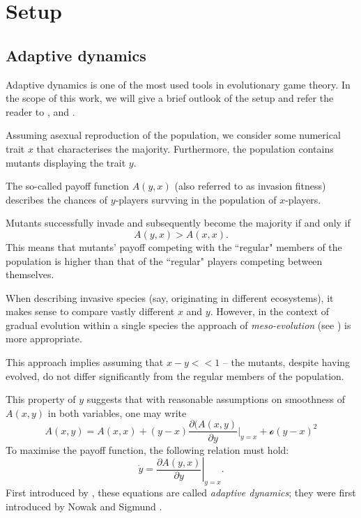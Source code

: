 \documentclass{article}
\theoremstyle{definition}
\numberwithin{equation}{section}
\begin{document}
\section{Setup}
\subsection{Adaptive dynamics}
\label{sec: adaptive dynamics}
Adaptive dynamics is one of the most used tools in evolutionary game theory. In the scope of this work, we will give a brief outlook of the setup and refer the reader to \cite{balabanova2024adaptive, stewart:scirep:2016},  and \cite{Mamiya:PRE:2020}. 

Assuming asexual reproduction of the population, we consider some numerical trait $x$ that characterises the majority. Furthermore, the population contains mutants displaying the trait $y$. 

The so-called payoff function $A(y,x)$ (also referred to as invasion fitness) describes the chances of $y$-players survving in the population of $x$-players. 

Mutants successfully invade and subsequently become the majority if and only if
\[
A(y,x)> A(x,x).
\]
This means that mutants' payoff competing with the ``regular" members of the population is higher than that of the ``regular" players competing between themselves. 

When describing invasive species (say, originating in different ecosystems), it makes sense to compare vastly different $x$ and $y$. However, in the context of gradual evolution within a single species the approach of \textit{meso-evolution} (see  \cite{metz2012adaptive})   is more appropriate. 

This approach implies assuming that $x-y<<1$ -- the mutants, despite having evolved, do not differ significantly from the regular members of the population. 

This property of $y$ suggests that with reasonable assumptions on smoothness of $A(x,y)$ in both variables, one may write
\[
A(x,y) = A(x,x) + (y-x)\frac{\partial (A(x,y)}{\partial y}\big\vert_{y=x} + \mathcal{o}(y-x)^2
\]
To maximise the payoff function, the following relation must hold:
\begin{equation}
    \label{eq: adaptive dynamics}
    \dot{y} = \left. \frac{\partial A(y,x)}{\partial y}\right|_{y=x}.
\end{equation}
First introduced by \cite{hofbauer1990adaptive}, these equations are called \textit{adaptive dynamics}; they were first introduced by Nowak and Sigmund \cite{nowak:AAM:1990}. 
\end{document}
